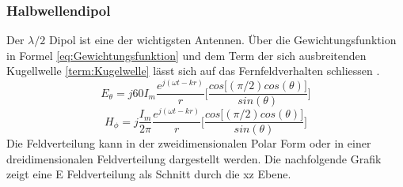 \subsubsection{Halbwellendipol}
Der $\lambda/2$ Dipol ist eine der wichtigsten Antennen. Über die Gewichtungsfunktion in Formel \ref{eq:Gewichtungsfunktion} und dem Term der sich ausbreitenden Kugellwelle \ref{term:Kugelwelle} lässt sich auf das Fernfeldverhalten schliessen \cite{elliott1981antenna}.
\begin{equation}
E_{\theta}=j60I_{m} \frac{e^{j(\omega t - kr)}}{r} \biggl\lbrack \frac{cos\lbrack  (\pi/2) cos(\theta)\rbrack}{sin(\theta)} \biggr\rbrack
\end{equation}
\begin{equation}
H_{\phi}=j \frac{I_{m}}{2\pi} \frac{e^{j(\omega t - kr)}}{r} \biggl\lbrack \frac{cos\lbrack  (\pi/2) cos(\theta)\rbrack}{sin(\theta)} \biggr\rbrack
\end{equation}
Die Feldverteilung kann in der  zweidimensionalen Polar Form oder in einer dreidimensionalen Feldverteilung dargestellt werden.
Die nachfolgende Grafik zeigt eine E Feldverteilung als Schnitt durch die xz Ebene.\\



